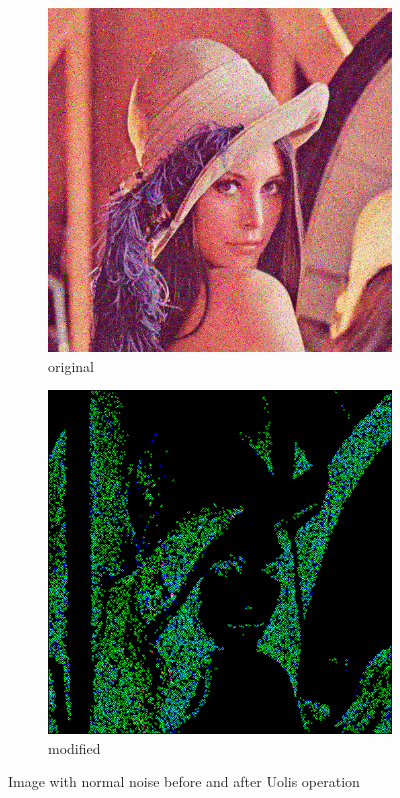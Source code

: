 \documentclass[12pt]{article}
\begin{document}
\begin{figure}[H]\centering
    \begin{subfigure}[t]{\subfiguresize}\centering
        \includegraphics[width=\textwidth]{lenac_normal3.png}
        \caption{original}
    \end{subfigure}
    \hspace{.05\textwidth}
    \begin{subfigure}[t]{\subfiguresize}\centering
        \includegraphics[width=\textwidth]{lena_uolis_normal.png}
        \caption{modified}
    \end{subfigure}
    \caption{Image with normal noise before and after Uolis operation}
\end{figure}
\end{document}
